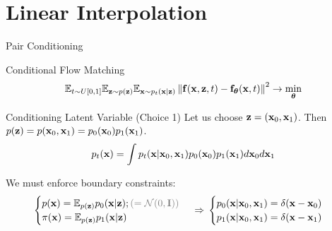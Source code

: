 \documentclass{beamer}
\begin{document}
\section{Linear Interpolation}
\begin{frame}{Pair Conditioning}
	\begin{block}{Conditional Flow Matching}
		\vspace{-0.3cm}
		\[
			\mathbb{E}_{t \sim U[0, 1]} \mathbb{E}_{\mathbf{z} \sim p(\mathbf{z})} \mathbb{E}_{\mathbf{x} \sim p_t(\mathbf{x} | \mathbf{z})}\left\| \mathbf{f}(\mathbf{x}, \mathbf{z}, t) - \mathbf{f}_{\boldsymbol{\theta}}(\mathbf{x}, t) \right\|^2 \rightarrow \min_{\boldsymbol{\theta}}
		\]
		\vspace{-0.3cm}
	\end{block}
	\begin{block}{Conditioning Latent Variable (Choice 1)}
		Let us choose $\mathbf{z} = (\mathbf{x}_0, \mathbf{x}_1)$. Then $p(\mathbf{z}) = p (\mathbf{x}_0, \mathbf{x}_1) = p_0(\mathbf{x}_0) p_1(\mathbf{x}_1)$.
		\[
			p_t(\mathbf{x}) = \int p_t(\mathbf{x} | \mathbf{x}_0, \mathbf{x}_1) p_0(\mathbf{x}_0) p_1(\mathbf{x}_1) d \mathbf{x}_0 d \mathbf{x}_1
		\]
	\end{block}
	We must enforce boundary constraints:
	\[
		\begin{cases}
			p(\bx) = \bbE_{p(\bz)} p_0(\bx | \bz); {\color{gray}(= \cN(0, \bI))} \\
			\pi(\bx) = \bbE_{p(\bz)} p_1(\bx | \bz)
		\end{cases}
		\, \Rightarrow \, 
		\begin{cases}
			p_0(\bx | \bx_0, \bx_1) = \delta(\bx - \bx_0) \\
			p_1(\bx | \bx_0, \bx_1) = \delta(\bx - \bx_1)
		\end{cases}
	\]
	\vspace{-0.3cm}
\end{frame}
\end{document}
